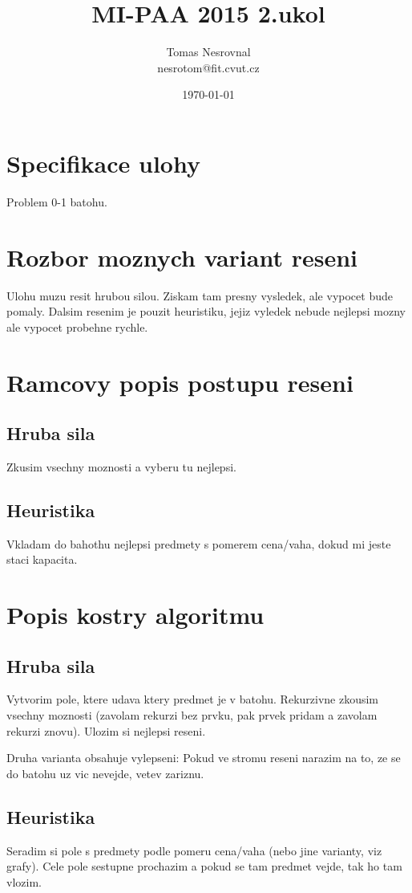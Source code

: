 \documentclass[12pt,a4paper]{article}
\begin{document}
\title{MI-PAA 2015 2.ukol}
\author{Tomas Nesrovnal\\nesrotom@fit.cvut.cz}
\date{\today}
\maketitle

\section{Specifikace ulohy}
Problem 0-1 batohu.

\section{Rozbor moznych variant reseni}
Ulohu muzu resit hrubou silou. Ziskam tam presny vysledek, ale vypocet bude
pomaly. Dalsim resenim je pouzit heuristiku, jejiz vyledek nebude nejlepsi mozny
ale vypocet probehne rychle.

\section{Ramcovy popis postupu reseni}
\subsection{Hruba sila}
Zkusim vsechny moznosti a vyberu tu nejlepsi.

\subsection{Heuristika}
Vkladam do bahothu nejlepsi predmety s pomerem cena/vaha, dokud
mi jeste staci kapacita.

\section{Popis kostry algoritmu}
\subsection{Hruba sila}
Vytvorim pole, ktere udava ktery predmet je v batohu. Rekurzivne zkousim
vsechny moznosti (zavolam rekurzi bez prvku, pak prvek pridam a zavolam rekurzi znovu).
Ulozim si nejlepsi reseni.

Druha varianta obsahuje vylepseni: Pokud ve stromu reseni narazim na to, ze se do batohu uz vic nevejde, vetev zariznu.

\subsection{Heuristika}
Seradim si pole s predmety podle pomeru cena/vaha (nebo jine varianty, viz grafy). Cele pole sestupne prochazim a pokud se tam predmet vejde, tak ho tam vlozim.
\end{document}
